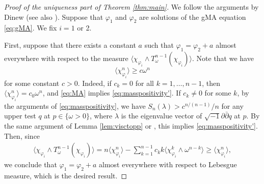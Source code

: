 \documentclass[10pt,a4paper]{amsart}
\numberwithin{equation}{section}
\newcommand{\delb}{\sqrt{-1}\partial\bar{\partial}}
\begin{document}
\begin{proof}[Proof of the uniqueness part of Theorem \ref{thm:main}]
    We follow the arguments by Dinew \cite{Dinew} (see also \cite[Section 3.3]{BEGZ}). Suppose that $\varphi_1$ and $\varphi_2$ are solutions of the gMA equation \eqref{eq:gMA}. We fix $i=1$ or 2.
    
    First, suppose that there exists a constant $a$ such that $\varphi_1=\varphi_2+a$ almost everywhere with respect to the measure $\langle\chi_{\varphi_i}\wedge T^{n-1}_\omega(\chi_{\varphi_i})\rangle$. Note that we have 
    \begin{equation}\label{eq:masspositivity'}
        \langle\chi_{\varphi_i}^n\rangle\ge c\omega^n
    \end{equation}
    for some constant $c>0$. Indeed, if $c_k=0$ for all $k=1,\dots,n-1$, then $\langle\chi_{\varphi_i}^n\rangle=c_0\omega^n$, and \eqref{eq:MA} implies \eqref{eq:masspositivity'}. If $c_k\neq0$ for some $k$, by the arguments of \eqref{eq:masspositivity}, we have $S_n(\lambda)>c^{n/(n-1)}/n$
    for any upper test $q$ at $p\in\{\omega>0\}$, where $\lambda$ is the eigenvalue vector of $\delb q$ at $p$. 
    By the same argument of Lemma \ref{lem:visctopp} or \cite[Corollary 2.6]{EGZ}, this implies \eqref{eq:masspositivity'}.
    Then, since
    \begin{equation*}
        \begin{aligned}
            \langle\chi_{\varphi_i}\wedge T^{n-1}_\omega(\chi_{\varphi_i})\rangle
            =n\langle\chi_{\varphi_i}^n\rangle-\sum_{k=1}^{n-1}c_k k\langle\chi_{\varphi_i}^k\wedge\omega^{n-k}\rangle\ge\langle\chi_{\varphi_i}^n\rangle,
        \end{aligned}
    \end{equation*}
    we conclude that $\varphi_1=\varphi_2+a$ almost everywhere with respect to Lebesgue measure, which is the desired result.
    

\end{proof}
\end{document}

